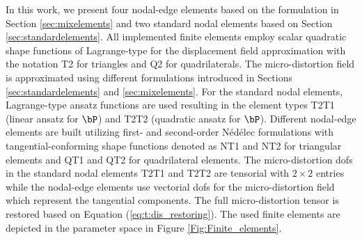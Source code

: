 In this work, we present four nodal-edge elements based on the formulation in Section \ref{sec:mixelements} and two standard nodal elements based on Section \ref{sec:standardelements}.  All  implemented finite elements employ scalar quadratic shape functions of Lagrange-type for the displacement field approximation with the notation  T2 for triangles and Q2 for quadrilaterals.  The micro-distortion field is approximated using different formulations introduced in Sections \ref{sec:standardelements} and \ref{sec:mixelements}. For the standard nodal elements, Lagrange-type ansatz functions are used resulting in the element types T2T1 (linear ansatz for $\Bdis$) and  T2T2 (quadratic ansatz for $\Bdis$). Different nodal-edge elements  are built utilizing first- and second-order N\'ed\'elec formulations with tangential-conforming shape functions denoted as NT1 and NT2 for triangular elements and QT1 and QT2 for quadrilateral elements. The micro-distortion dofs in the standard nodal elements T2T1 and T2T2 are tensorial with $2 \times 2$ entries while the nodal-edge elements use vectorial dofs for the micro-distortion field which represent the tangential components. The full micro-distortion tensor is restored based on Equation (\ref{eq:t:dis_restoring}).   The used finite elements are depicted in the parameter space in Figure \ref{Fig:Finite_elements}. 
